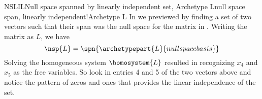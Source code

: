%
\begin{example}{NSLIL}{Null space spanned by linearly independent set,  Archetype L}{null space span, linearly independent!Archetype L}
In  we previewed  by finding a set of two vectors such that their span was the null space for the matrix in .  Writing the matrix as $L$, we have
%
\begin{equation*}
\nsp{L}=
\spn{\archetypepart{L}{nullspacebasis}}
\end{equation*}
%
Solving the homogeneous system $\homosystem{L}$ resulted in recognizing $x_4$ and $x_5$ as the free variables.  So look in entries 4 and 5 of the two vectors above and notice the pattern of zeros and ones that provides the linear independence of the set.
%
\end{example}
%

%

